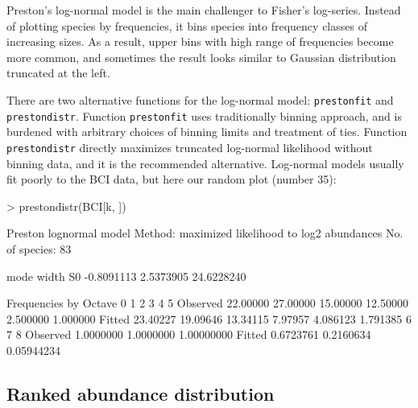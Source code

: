 \documentclass[a4paper,10pt]{amsart}
\begin{document}
Preston's log-normal model is the main challenger to Fisher's
log-series.  Instead of plotting species by frequencies, it bins
species into frequency classes of increasing sizes.  As a result,
upper bins with high range of frequencies become more common, and
sometimes the result looks similar to Gaussian distribution truncated
at the left.

There are two alternative functions for the log-normal model:
\texttt{prestonfit} and \texttt{prestondistr}.  Function
\texttt{prestonfit} uses traditionally binning approach, and is burdened
with arbitrary choices of binning limits and treatment of ties.
Function \texttt{prestondistr} directly
maximizes truncated log-normal likelihood without binning data, and it
is the recommended alternative.  Log-normal models  usually fit poorly
to the BCI data, but here our random plot (number 35):
\begin{Schunk}
\begin{Sinput}
> prestondistr(BCI[k, ])
\end{Sinput}
\begin{Soutput}
Preston lognormal model
Method: maximized likelihood to log2 abundances 
No. of species: 83 

      mode      width         S0 
-0.8091113  2.5373905 24.6228240 

Frequencies by Octave
                0        1        2        3        4        5
Observed 22.00000 27.00000 15.00000 12.50000 2.500000 1.000000
Fitted   23.40227 19.09646 13.34115  7.97957 4.086123 1.791385
                 6         7          8
Observed 1.0000000 1.0000000 1.00000000
Fitted   0.6723761 0.2160634 0.05944234
\end{Soutput}
\end{Schunk}

\subsection{Ranked abundance distribution}
\end{document}
